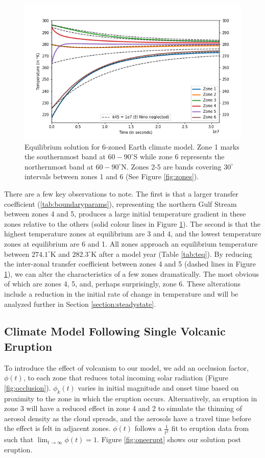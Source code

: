 \documentclass[12pt]{article}
\begin{document}
\begin{figure}[H]
    \centering
    \includegraphics[scale=0.5]{Question2.png}
    \caption{
        Equilibrium solution for 6-zoned Earth climate model. Zone 1 marks the
        southernmost band at $60-90^{\circ}$S while zone 6 represents the
        northernmost band at $60-90^{\circ}$N. Zones 2-5 are bands covering
        $30^{\circ}$ intervals between zones 1 and 6
        (See Figure \ref{fig:zones}).
    }
    \label{fig:steadystate}
\end{figure}
\FloatBarrier

There are a few key observations to note. The first is that a larger transfer
coefficient (\ref{tab:boundaryparams}), representing the northern Gulf Stream
between zones 4 and 5, produces a large initial temperature gradient in these
zones relative to the others (solid colour lines in Figure
\ref{fig:steadystate}). The second is that the highest temperature zones at
equilibrium are 3 and 4, and the lowest temperature zones at equilibrium are 6
and 1. All zones approach an equilibrium temperature between $274.1^{\circ}$K
and $282.3^{\circ}$K after a model year (Table \ref{tab:teq}). By reducing the
inter-zonal transfer coefficient between zones 4 and 5
(dashed lines in Figure \ref{fig:steadystate}), we can alter the characteristics
of a few zones dramatically. The most obvious of which are zones 4, 5, and,
perhaps surprisingly, zone 6. These alterations include a reduction in the
initial rate of change in temperature and will be analyzed further in Section
\ref{section:steadystate}.

\subsection{Climate Model Following Single Volcanic Eruption}
To introduce the effect of volcanism to our model, we add an occlusion factor,
$\phi(t)$, to each zone that reduces total incoming solar radiation
(Figure \ref{fig:occlusion}). $\phi_k(t)$ varies in initial magnitude and onset
time based on proximity to the zone in which the eruption occurs. Alternatively,
an eruption in zone 3 will have a reduced effect in zone 4 and 2 to simulate
the thinning of aerosol density as the cloud spreads, and the aerosols have a
travel time before the effect is felt in adjacent zones. $\phi(t)$ follows a
$\frac{1}{t^2}$ fit to eruption data from \cite{robock} such that
$\lim_{t\to\infty}\phi(t) = 1$.
Figure \ref{fig:oneerupt} shows our solution post eruption. 
\end{document}
